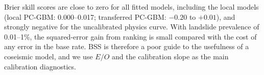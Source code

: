 Brier skill scores are close to zero for all fitted models, including the local models (local PC-GBM: 0.000--0.017; transferred PC-GBM: $-0.20$ to $+0.01$), and strongly negative for the uncalibrated physics curve. With landslide prevalence of 0.01--1\%, the squared-error gain from ranking is small compared with the cost of any error in the base rate. BSS is therefore a poor guide to the usefulness of a coseismic model, and we use $E/O$ and the calibration slope as the main calibration diagnostics.


